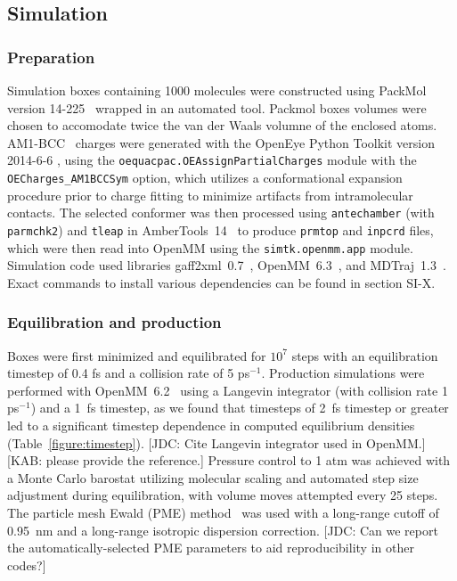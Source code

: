 \documentclass[aps,pre,twocolumn,nofootinbib,superscriptaddress,linenumbers]{revtex4-1}
\begin{document}
\subsection{Simulation}
\label{section:simulation}

\subsubsection{Preparation}
\label{section:preparation}

Simulation boxes containing 1000 molecules were constructed using PackMol version 14-225~\cite{martinez2009packmol, packmolurl} wrapped in an automated tool.
Packmol boxes volumes were chosen to accomodate twice the van der Waals volumne of the enclosed atoms.  
AM1-BCC~\cite{am1bcc1,am1bcc2, velez2014time} charges were generated with the OpenEye Python Toolkit version 2014-6-6 \cite{openeye}, using the {\tt oequacpac.OEAssignPartialCharges} module with the {\tt OECharges\_AM1BCCSym} option, which utilizes a conformational expansion procedure prior to charge fitting to minimize artifacts from intramolecular contacts.  
The selected conformer was then processed using {\tt antechamber} (with {\tt parmchk2}) and {\tt tleap} in AmberTools~14~\cite{amber14} to produce {\tt prmtop} and {\tt inpcrd} files, which were then read into OpenMM using the {\tt simtk.openmm.app} module.
Simulation code used libraries gaff2xml~0.7~\cite{gaff2xml}, OpenMM~6.3~\cite{eastman2012openmm}, and MDTraj~1.3~\cite{mcgibbon2014mdtraj}.  
Exact commands to install various dependencies can be found in section SI-X.  

\subsubsection{Equilibration and production}

Boxes were first minimized and equilibrated for $10^7$ steps with an equilibration timestep of 0.4 fs and a collision rate of 5 ps$^{-1}$.  
Production simulations were performed with OpenMM~6.2~\cite{eastman2012openmm} using a Langevin integrator (with collision rate 1 ps$^{-1}$) and a 1~fs timestep, as we found that timesteps of 2~fs timestep or greater led to a significant timestep dependence in computed equilibrium densities (Table~\ref{figure:timestep}).  
{\color{red}[JDC: Cite Langevin integrator used in OpenMM.]}
{\color{red}[KAB: please provide the reference.]}
Pressure control to 1 atm was achieved with a Monte Carlo barostat utilizing molecular scaling and automated step size adjustment during equilibration, with volume moves attempted every 25 steps.  
The particle mesh Ewald (PME) method~\cite{Darden1993} was used with a long-range cutoff of 0.95~nm and a long-range isotropic dispersion correction. 
{\color{red}[JDC: Can we report the automatically-selected PME parameters to aid reproducibility in other codes?]}
\end{document}
